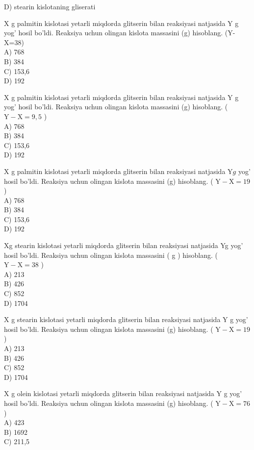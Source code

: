 D) stearin kislotaning gliserati
  \item X g palmitin kislotasi yetarli miqdorda glitserin bilan reaksiyasi natjasida Y g yog' hosil bo'ldi. Reaksiya uchun olingan kislota massasini (g) hisoblang. (Y-X=38)\\
A) 768\\
B) 384\\
C) 153,6\\
D) 192
  \item X g palmitin kislotasi yetarli miqdorda glitserin bilan reaksiyasi natjasida Y g yog' hosil bo'ldi. Reaksiya uchun olingan kislota massasini (g) hisoblang. ( $\mathrm{Y}-\mathrm{X}=9,5$ )\\
A) 768\\
B) 384\\
C) 153,6\\
D) 192
  \item X g palmitin kislotasi yetarli miqdorda glitserin bilan reaksiyasi natjasida $\mathrm{Y} g$ yog' hosil bo'ldi. Reaksiya uchun olingan kislota massasini (g) hisoblang. ( $\mathrm{Y}-\mathrm{X}=19$ )\\
A) 768\\
B) 384\\
C) 153,6\\
D) 192
  \item Xg stearin kislotasi yetarli miqdorda glitserin bilan reaksiyasi natjasida Yg yog' hosil bo'ldi. Reaksiya uchun olingan kislota massasini ( g ) hisoblang. ( $\mathrm{Y}-\mathrm{X}=38$ )\\
A) 213\\
B) 426\\
C) 852\\
D) 1704
  \item X g stearin kislotasi yetarli miqdorda glitserin bilan reaksiyasi natjasida Y g yog' hosil bo'ldi. Reaksiya uchun olingan kislota massasini (g) hisoblang. ( $\mathrm{Y}-\mathrm{X}=19$ )\\
A) 213\\
B) 426\\
C) 852\\
D) 1704
  \item X g olein kislotasi yetarli miqdorda glitserin bilan reaksiyasi natjasida Y g yog' hosil bo'ldi. Reaksiya uchun olingan kislota massasini (g) hisoblang. ( $\mathrm{Y}-\mathrm{X}=76$ )\\
A) 423\\
B) 1692\\
C) 211,5\\
